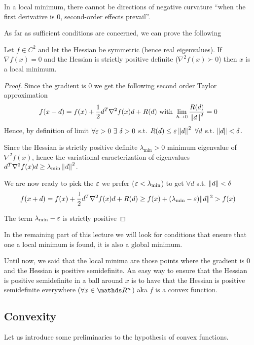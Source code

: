 \documentclass[ComputationalMathematics.tex]{subfiles}
\begin{document}
  In a local minimum, there cannot be directions of  negative curvature ``when the first derivative is $0$, second-order effects prevail''.

As far as sufficient conditions are concerned, we can prove the following

\begin{proposition}
  Let $f \in C^2$ and let the Hessian be symmetric (hence real eigenvalues).
  If $\nabla f(x) = 0$ and the Hessian is strictly positive definite ($\nabla^2 f(x) \succ 0$) then $x$ is a local minimum.
\end{proposition}

\begin{proof}
Since the gradient is $0$ we get the following second order Taylor approximation
\[
  f(x + d) = f(x) + \frac{1}{2} d^T \nabla^2 f(x) d + R(d)\mbox{ with } \lim\limits_{h \to 0} \frac{R(d)}{\left\lVert d\right\rVert^2} = 0
\]
  Hence, by definition of limit $\forall \varepsilon > 0~\exists~\delta > 0$ s.t. $R(d) \leq \varepsilon \left\lVert d\right\rVert^2~\forall d$ s.t. $\left\lVert d\right\rVert < \delta$.

Since the Hessian is strictly positive definite $\lambda_{\text{min}} > 0$ minimum eigenvalue of $\nabla^2 f(x)$, hence the variational caracterization of eigenvalues $d^T \nabla^2 f(x) d \geq \lambda_{\text{min}} \left\lVert d\right\rVert^2$.

  We are now ready to pick the $\varepsilon$ we prefer ($\varepsilon < \lambda_{\text{min}}$) to get $\forall d$ s.t. $\left\lVert d\right\rVert < \delta$
\[
  f(x + d) = f(x) + \frac{1}{2} d^T \nabla^2 f(x) d + R(d) \geq f(x) + (\lambda_{\text{min}} - \varepsilon)\|d\|^2 > f(x)
\]

  The term $\lambda_{\text{min}} - \varepsilon$ is strictly positive
\end{proof}

In the remaining part of this lecture we will look for conditions that ensure that one a local minimum is found, it is also a global minimum.

Until now, we said that the local minima are those points where the gradient is $0$ and the Hessian is positive semidefinite.
An easy way to ensure that the Hessian is positive semidefinite in a ball around $x$ is to have that the Hessian is positive semidefinite everywhere ($\forall x \in \R^n$) aka $f$ is a convex function.

\subsection{Convexity}
Let us introduce some preliminaries to the hypothesis of convex functions.
\end{document}
